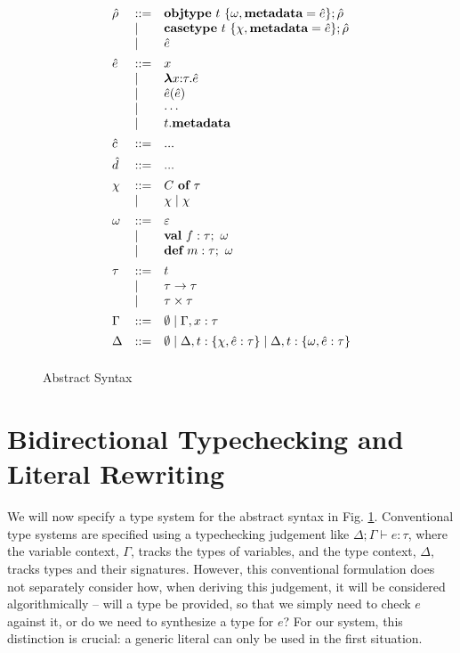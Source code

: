 \begin{figure}[t]
\[\begin{array}[t]{lll}
\hat\rho & \bnfdef & \keyw{objtype}~ t~ \{ \omega, \keyw{metadata}=\hat e \}; \hat\rho \\
     & \bnfalt & \keyw{casetype}~ t~ \{ \chi, \keyw{metadata}=\hat e \}; \hat\rho\\
     & \bnfalt & \hat e
     \\[1ex]
\hat{e}    & \bnfdef & x \\
     & \bnfalt & \boldsymbol\lambda x{:}\tau . \hat{e} \\ %
     & \bnfalt & \hat{e}(\hat{e}) \\
     & \bnfalt & \cdots \\
     & \bnfalt & t.\keyw{metadata} 
\\[1ex]
\hat c    & \bnfdef & ...
	 \\[1ex]
\hat d   & \bnfdef & ... 
\\[1ex] 
\chi & \bnfdef & C~\keyw{of}~\tau\\
     & \bnfalt & \chi \bnfalt \chi 
\\[1ex]
\omega &\bnfdef & \varepsilon \\  
         & \bnfalt & \keyw{val}~ f:\tau;~\omega\\
         & \bnfalt & \keyw{def}~ m:\tau;~\omega 
\\[1ex]
\tau & \bnfdef & t\\
     & \bnfalt & \tau \rightarrow \tau \\
     & \bnfalt & \tau \times \tau 
\\[1ex]
\Gamma & \bnfdef & \emptyset \bnfalt \Gamma, x:\tau
\\[1ex]
\Delta & \bnfdef & \emptyset \bnfalt \Delta, t:\{\chi, \hat e:\tau\} \bnfalt \Delta, t:\{\omega, \hat e:\tau\}
\\[1ex]

\end{array}
\]
\caption{Abstract Syntax}
\label{fig:core2-syntax}
\end{figure}

\section{Bidirectional Typechecking and Literal Rewriting}
We will now specify a type system for the abstract syntax in Fig. \ref{fig:core2-syntax}. Conventional type systems are specified using a typechecking judgement like $\Delta; \Gamma \vdash e : \tau$, where the variable context, $\Gamma$, tracks the types of variables, and the type context, $\Delta$, tracks types and their signatures. However, this conventional formulation does not separately consider how, when deriving this judgement, it will be considered algorithmically -- will a type be provided, so that we simply need to check $e$ against it, or do we need to synthesize a type for $e$? For our system, this distinction is crucial: a generic literal can only be used in the first situation. 

